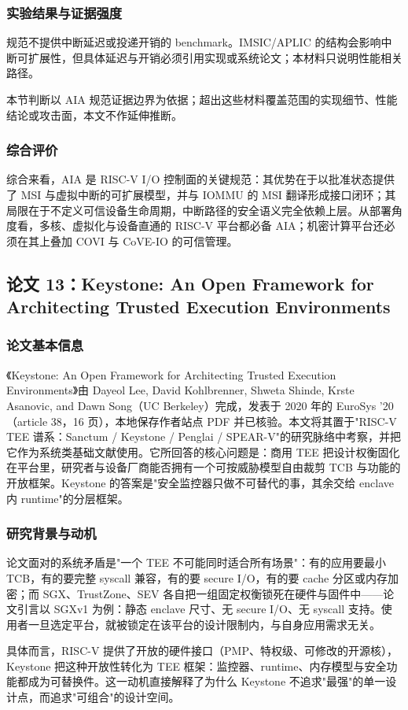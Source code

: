 \documentclass[11pt]{ctexart}
\begin{document}
\subsubsection{实验结果与证据强度}
规范不提供中断延迟或投递开销的 benchmark。IMSIC/APLIC 的结构会影响中断可扩展性，但具体延迟与开销必须引用实现或系统论文；本材料只说明性能相关路径。\par
本节判断以 AIA 规范证据边界为依据；超出这些材料覆盖范围的实现细节、性能结论或攻击面，本文不作延伸推断。\par
\subsubsection{综合评价}
综合来看，AIA 是 RISC-V I/O 控制面的关键规范：其优势在于以批准状态提供了 MSI 与虚拟中断的可扩展模型，并与 IOMMU 的 MSI 翻译形成接口闭环；其局限在于不定义可信设备生命周期，中断路径的安全语义完全依赖上层。从部署角度看，多核、虚拟化与设备直通的 RISC-V 平台都必备 AIA；机密计算平台还必须在其上叠加 COVI 与 CoVE-IO 的可信管理。\par
\subsection{论文 13：Keystone: An Open Framework for Architecting Trusted Execution Environments}
\subsubsection{论文基本信息}
《Keystone: An Open Framework for Architecting Trusted Execution Environments》由 Dayeol Lee, David Kohlbrenner, Shweta Shinde, Krste Asanovic, and Dawn Song（UC Berkeley）完成，发表于 2020 年的 EuroSys '20（article 38，16 页），本地保存作者站点 PDF 并已核验。本文将其置于"RISC-V TEE 谱系：Sanctum / Keystone / Penglai / SPEAR-V"的研究脉络中考察，并把它作为系统类基础文献使用。它所回答的核心问题是：商用 TEE 把设计权衡固化在平台里，研究者与设备厂商能否拥有一个可按威胁模型自由裁剪 TCB 与功能的开放框架。Keystone 的答案是"安全监控器只做不可替代的事，其余交给 enclave 内 runtime"的分层框架。\cite{lee2020keystone}\par
\subsubsection{研究背景与动机}
论文面对的系统矛盾是"一个 TEE 不可能同时适合所有场景"：有的应用要最小 TCB，有的要完整 syscall 兼容，有的要 secure I/O，有的要 cache 分区或内存加密；而 SGX、TrustZone、SEV 各自把一组固定权衡锁死在硬件与固件中——论文引言以 SGXv1 为例：静态 enclave 尺寸、无 secure I/O、无 syscall 支持。使用者一旦选定平台，就被锁定在该平台的设计限制内，与自身应用需求无关。\par
具体而言，RISC-V 提供了开放的硬件接口（PMP、特权级、可修改的开源核），Keystone 把这种开放性转化为 TEE 框架：监控器、runtime、内存模型与安全功能都成为可替换件。这一动机直接解释了为什么 Keystone 不追求"最强"的单一设计点，而追求"可组合"的设计空间。\par
\end{document}
